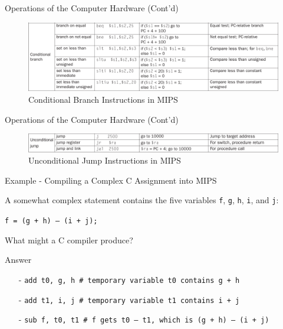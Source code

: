 \begin{frame}{Operations of the Computer Hardware (Cont'd)}
\begin{figure}\caption{Conditional Branch Instructions in MIPS}
\begin{center}
\includegraphics[width=\textwidth, height=0.5\textheight]{docs/images/operations-4}
\end{center}
\end{figure}
\end{frame}

\begin{frame}{Operations of the Computer Hardware (Cont'd)}
\begin{figure}\caption{Unconditional Jump Instructions in MIPS}
\begin{center}
\includegraphics[width=\textwidth, height=0.17\textheight]{docs/images/operations-5  }
\end{center}
\end{figure}
\end{frame}

\begin{frame}{Example - Compiling a Complex C Assignment into MIPS}
\begin{flushleft}
A somewhat complex statement contains the five variables \texttt{f}, \texttt{g}, \texttt{h}, \texttt{i}, and \texttt{j}:

\hspace{8mm}\texttt{f = (g + h) – (i + j);}

What might a C compiler produce?
\end{flushleft}
\end{frame}

\begin{frame}[fragile]{Answer}
\begin{itemize}
\item[-]
\texttt{add t0, g, h \# temporary variable t0 contains g + h}

\item[-]
\texttt{add t1, i, j \# temporary variable t1 contains i + j}

\item[-]
\texttt{sub f, t0, t1 \# f gets t0 – t1, which is (g + h) – (i + j)}
\end{itemize}
\end{frame}

